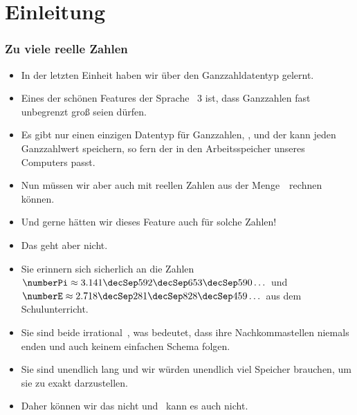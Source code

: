 \documentclass[aspectratio=169,mathserif,notheorems]{beamer}%
\subtitle{8.~Der Datentyp float}%
\begin{document}
%
%
\startPresentation%
%
\section{Einleitung}%
\begin{frame}%
\frametitle{Zu viele reelle Zahlen}%
\begin{itemize}%
\item In der letzten Einheit haben wir über den Ganzzahldatentyp  gelernt.%
\item<2-> Eines der schönen Features der Sprache \python~3 ist, dass Ganzzahlen fast unbegrenzt groß seien dürfen.
\item<3-> Es gibt nur einen einzigen Datentyp für Ganzzahlen, , und der kann jeden Ganzzahlwert speichern, so fern der in den Arbeitsspeicher unseres Computers passt.%
\item<4-> Nun müssen wir aber auch mit reellen Zahlen aus der Menge~\realNumbers\ rechnen können.%
\item<5-> Und gerne hätten wir dieses Feature auch für solche Zahlen!%
\item<6-> Das geht aber nicht.%
\item<7-> Sie erinnern sich sicherlich an die Zahlen $\numberPi\approx3.141\decSep592\decSep653\decSep590\dots$ und $\numberE\approx2.718\decSep281\decSep828\decSep459\dots$ aus dem Schulunterricht.%
\item<8-> Sie sind beide \gls{irrational}~, was bedeutet, dass ihre Nachkommastellen niemals enden und auch keinem einfachen Schema folgen.%
\item<9-> Sie sind unendlich lang und wir würden unendlich viel Speicher brauchen, um sie zu exakt darzustellen.%
\item<10-> Daher können wir das nicht und \python\ kann es auch nicht.%
\end{itemize}%
\end{frame}%
%
\end{document}
